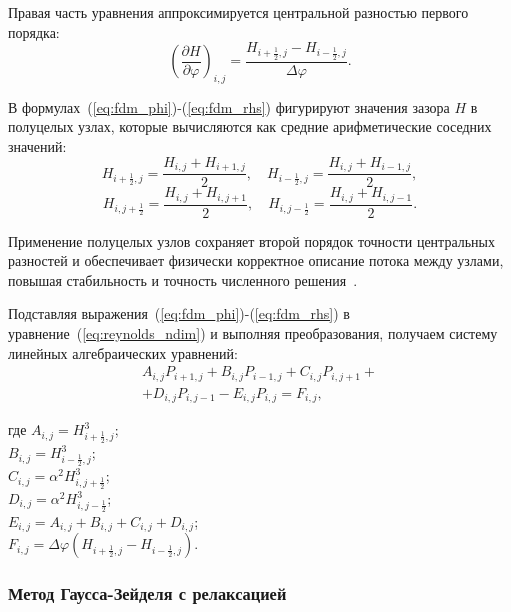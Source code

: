 Правая часть уравнения аппроксимируется центральной разностью первого порядка:
\begin{equation}
    \left(\frac{\partial H}{\partial\varphi}\right)_{i,j} = \frac{H_{i+\frac12,j} - H_{i-\frac12,j}}{\Delta\varphi}.
    \label{eq:fdm_rhs}
\end{equation}

В формулах~(\ref{eq:fdm_phi})-(\ref{eq:fdm_rhs}) фигурируют значения зазора $H$ в полуцелых узлах, которые вычисляются как средние арифметические соседних значений:
\begin{equation}
    H_{i+\frac12,j} = \frac{H_{i,j} + H_{i+1,j}}{2}, \quad H_{i-\frac12,j} = \frac{H_{i,j} + H_{i-1,j}}{2},
    \label{eq:half_phi}
\end{equation}
\begin{equation}
    H_{i,j+\frac12} = \frac{H_{i,j} + H_{i,j+1}}{2}, \quad H_{i,j-\frac12} = \frac{H_{i,j} + H_{i,j-1}}{2}.
    \label{eq:half_z}
\end{equation}

Применение полуцелых узлов сохраняет второй порядок точности центральных разностей и обеспечивает физически корректное описание потока между узлами, повышая стабильность и точность численного решения~\cite{hamrock}.

Подставляя выражения~(\ref{eq:fdm_phi})-(\ref{eq:fdm_rhs}) в уравнение~(\ref{eq:reynolds_ndim}) и выполняя преобразования, получаем систему линейных алгебраических уравнений:
\begin{equation}
    \begin{split}
    A_{i,j} P_{i+1,j} + B_{i,j} P_{i-1,j} + C_{i,j} P_{i,j+1} + {} \\
    + D_{i,j} P_{i,j-1} - E_{i,j} P_{i,j} = F_{i,j},
    \end{split}
    \label{eq:fdm}
\end{equation}

\noindent где $A_{i,j} = H_{i+\frac12,j}^3$;\\
\hphantom{где }$B_{i,j} = H_{i-\frac12,j}^3$;\\
\hphantom{где }$C_{i,j} = \alpha^2 H_{i,j+\frac12}^3$;\\
\hphantom{где }$D_{i,j} = \alpha^2 H_{i,j-\frac12}^3$;\\
\hphantom{где }$E_{i,j} = A_{i,j} + B_{i,j} + C_{i,j} + D_{i,j}$;\\
\hphantom{где }$F_{i,j} = \Delta\varphi(H_{i+\frac12,j} - H_{i-\frac12,j})$.

\subsubsection{Метод Гаусса-Зейделя с релаксацией}

